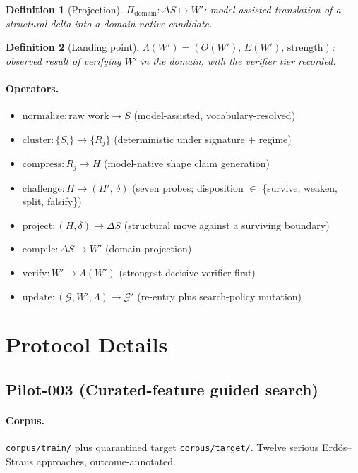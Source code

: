 \documentclass[11pt]{article}
\theoremstyle{gowthm}
\newtheorem{definition}{Definition}[section]
\theoremstyle{gowplain}
\begin{document}
\begin{definition}[Projection]
$\Pi_{\text{domain}}: \Delta S \mapsto W'$: model-assisted translation of a
structural delta into a domain-native candidate.
\end{definition}

\begin{definition}[Landing point]
$\Lambda(W') = (O(W'),\, E(W'),\, \text{strength})$: observed result of
verifying $W'$ in the domain, with the verifier tier recorded.
\end{definition}

\paragraph{Operators.}
\begin{itemize}[nosep]
  \item $\text{normalize}: \text{raw work} \to S$ (model-assisted, vocabulary-resolved)
  \item $\text{cluster}: \{S_i\} \to \{R_j\}$ (deterministic under signature + regime)
  \item $\text{compress}: R_j \to H$ (model-native shape claim generation)
  \item $\text{challenge}: H \to (H',\, \delta)$ (seven probes; disposition
    $\in$ \{survive, weaken, split, falsify\})
  \item $\text{project}: (H, \delta) \to \Delta S$ (structural move against a
    surviving boundary)
  \item $\text{compile}: \Delta S \to W'$ (domain projection)
  \item $\text{verify}: W' \to \Lambda(W')$ (strongest decisive verifier first)
  \item $\text{update}: (\mathcal{G}, W', \Lambda) \to \mathcal{G}'$ (re-entry
    plus search-policy mutation)
\end{itemize}

\section{Protocol Details}
\label{app:protocol}

\subsection{Pilot-003 (Curated-feature guided search)}

\paragraph{Corpus.} \texttt{corpus/train/} plus quarantined target
\texttt{corpus/target/}. Twelve serious Erd\H{o}s--Straus approaches, outcome-annotated.
\end{document}

